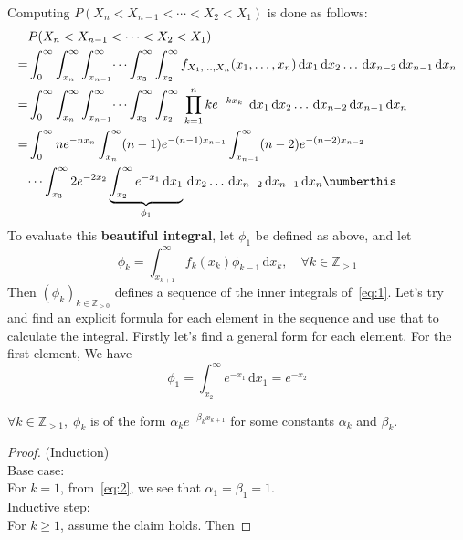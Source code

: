 \documentclass{mthe353answer}
\begin{document}
\begin{questions}
  Computing \(P(X_n<X_{n-1}<\cdots<X_2<X_1)\) is done as follows:
  \begin{align*}
    & P(X_n<X_{n-1}<\cdots<X_2<X_1)\\
    =& \int_{0}^{\infty} \int_{x_n}^{\infty} \int_{x_{n-1}}^{\infty} \dots \int_{x_{3}}^{\infty} \int_{x_{2}}^{\infty} 
      f_{X_1,\dots,X_n}(x_1,\dots,x_n)
      \, \mathrm{d}x_1 \, \mathrm{d}x_2\dots \, \mathrm{d}x_{n-2} \, \mathrm{d}x_{n-1} \, \mathrm{d}x_n\\
    =& \int_{0}^{\infty} \int_{x_n}^{\infty} \int_{x_{n-1}}^{\infty} \dots \int_{x_{3}}^{\infty} \int_{x_{2}}^{\infty} 
      \;\prod_{k=1}^{n} ke^{-kx_k}\;
      \, \mathrm{d}x_1 \, \mathrm{d}x_2\dots \, \mathrm{d}x_{n-2} \, \mathrm{d}x_{n-1} \, \mathrm{d}x_n\\
    =& \int_{0}^{\infty} ne^{-nx_n} \int_{x_n}^{\infty} (n-1)e^{-(n-1)x_{n-1}} \int_{x_{n-1}}^{\infty} (n-2)e^{-(n-2)x_{n-2}}\\
     & \dots \int_{x_{3}}^{\infty} 2e^{-2x_2} \underbrace{\int_{x_{2}}^{\infty} 
     e^{-x_1}
     \, \mathrm{d}x_1}_{\phi_1} \, \mathrm{d}x_2\dots \, \mathrm{d}x_{n-2} \, \mathrm{d}x_{n-1} \, \mathrm{d}x_n \numberthis \label{eq:1}
  \end{align*}
  To evaluate this \textbf{beautiful integral}, let \(\phi_1\) be defined as above, and 
  let
  \[
    \phi_k = \int_{x_{k+1}}^{\infty}f_k(x_k)\phi_{k-1} \, \mathrm{d}x_k,\quad \forall k \in \mathbb{Z}_{>1}
  \]
  Then \((\phi_k)_{k \in \mathbb{Z}_{>0}}\)
  defines a sequence of the inner integrals of~\eqref{eq:1}.
  Let's try and find an explicit formula for each element in the sequence and use
  that to calculate the integral. Firstly let's find a general form for each element.
  For the first element, We have
  \begin{equation}
    \phi_1 = \int_{x_{2}}^{\infty} e^{-x_1} \, \mathrm{d}x_1 = e^{-x_2} \label{eq:2}
  \end{equation}
  \begin{claim}
    \(\forall k \in \mathbb{Z}_{>1},\; \phi_k\) is of the form \(\alpha_k e^{-\beta_k x_{k+1}}\) for some constants \(\alpha_k\) and \(\beta_k\).
  \end{claim}
  \begin{proof} (Induction)\\
    Base case:\\
    For \(k = 1\), from~\eqref{eq:2}, we see that \(\alpha_1=\beta_1=1\).\\
    Inductive step:\\
    For \(k \ge 1\), assume the claim holds. Then

\end{proof}
\end{questions}
\end{document}
